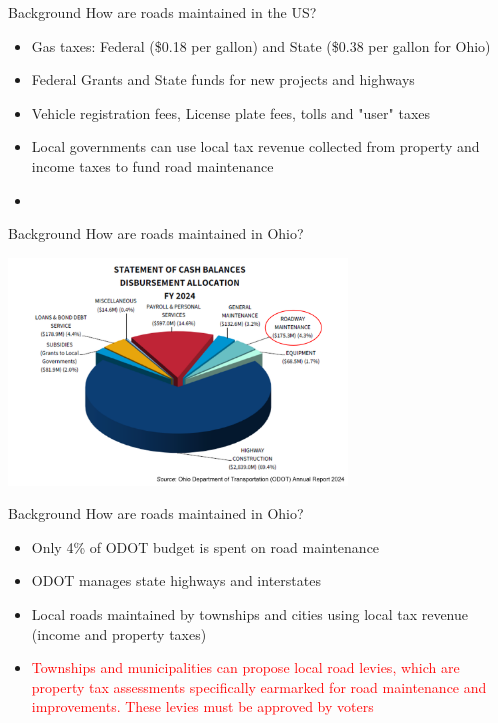 \documentclass{beamer}
\begin{document}
\begin{frame}{Background}
    How are roads maintained in the US? 
        
    \begin{itemize}
        \item Gas taxes: Federal (\$0.18 per gallon) and State (\$0.38 per gallon for Ohio)
        \item Federal Grants and State funds for new projects and highways
        \item Vehicle registration fees, License plate fees, tolls and "user" taxes
        \item Local governments can use local tax revenue collected from property and income taxes to fund road maintenance
        \item 
    \end{itemize}
    
\end{frame} 

\begin{frame}{Background}
    How are roads maintained in Ohio? 
        
    \includegraphics[width=9cm]{assets/imgs/odot_exp_2024.png}
    
\end{frame} 

\begin{frame}{Background}
    How are roads maintained in Ohio? 
        
    \begin{itemize}
        \item Only 4\% of ODOT budget is spent on road maintenance
        \item ODOT manages state highways and interstates
        \item Local roads maintained by townships and cities using local tax revenue (income and property taxes)
        \item \textcolor{red}{Townships and municipalities can propose local road levies, which are property tax assessments specifically earmarked for road maintenance and improvements. These levies must be approved by voters}
    \end{itemize}
    
\end{frame} 
\end{document}
